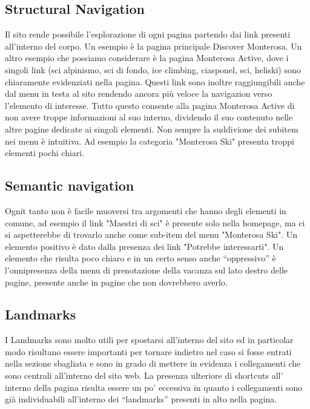         \subsection{Structural Navigation}
        Il sito rende possibile l'esplorazione di ogni pagina partendo dai link
        presenti all’interno del corpo. Un esempio è  la pagina principale
        Discover Monterosa.
        Un altro esempio che possiamo considerare è la pagina Monterosa Active,
        dove i singoli link  (sci alpinismo, sci di fondo, ice climbing,
        ciasponel, sci, heliski) sono chiaramente evidenziati nella pagina.
        Questi link sono inoltre raggiungibili anche dal menu in testa al sito rendendo ancora
        più veloce la navigazion verso l’elemento di interesse. Tutto questo consente
        alla pagina Monterosa Active di non avere troppe informazioni al suo
        interno, dividendo il suo contenuto nelle altre pagine dedicate ai
        singoli elementi.
        Non sempre la suddivione dei subitem nei menu è intuitiva. Ad esempio la
        categoria "Monterosa Ski" presenta troppi elementi pochi chiari.

        \subsection{Semantic navigation}
        Ognit tanto non è facile muoversi tra argomenti che hanno degli elementi in comune, ad
        esempio il link "Maestri di sci" è presente solo nella homepage, ma ci si aspetterebbe di 
        trovarlo anche come sub-item del menu "Monterosa Ski".
        Un elemento positivo è dato dalla presenza dei link "Potrebbe
        interessarti".
        Un elemento che risulta poco chiaro e in un certo senso anche
        “oppressivo” è l’onnipresenza della menu di prenotazione della vacanza
        sul lato destro delle pagine, presente anche in pagine che non
        dovrebbero averlo.
        \subsection{Landmarks}
        I Landmarks sono molto utili per spostarsi all'interno del sito ed in
        particolar modo risultano essere importanti per tornare indietro nel
        caso si fosse entrati nella sezione sbagliata e sono in grado di mettere
        in evidenza i collegamenti che sono centrali all'interno del sito web.
        La presenza ulteriore di shortcuts all’ interno della pagina risulta
        essere un po’ eccessiva in quanto i collegamenti sono già individuabili
        all'interno dei “landmarks” presenti in alto nella pagina.
  

